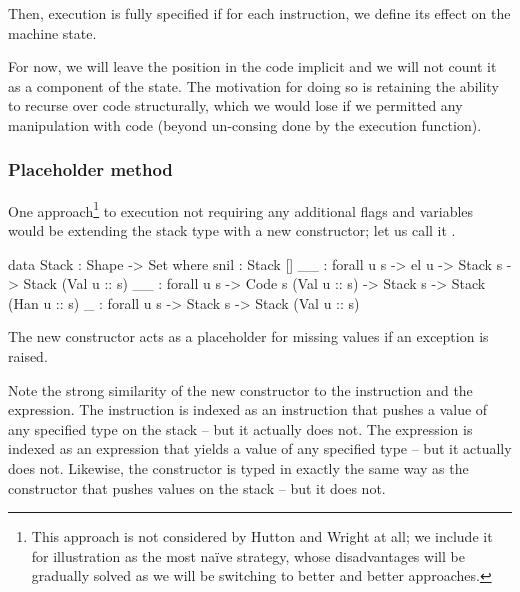 Then, execution is fully specified if for each instruction, we define its
effect on the machine state.

For now, we will leave the position in the code implicit and we will not count
it as a component of the state. The motivation for doing so is retaining
the ability to recurse over code structurally, which we would lose if we
permitted any manipulation with code (beyond un-consing done by the execution
function).

\subsubsection{Placeholder method}

One approach\footnote{This approach is not considered by Hutton and Wright at all;
we include it for illustration as the most na\"{i}ve strategy, whose disadvantages
will be gradually solved as we will be switching to better and better approaches.}
to execution not requiring any additional flags and variables
would be extending the stack type with a new constructor; let us call it
\ident{\void\scons\!\!\_}.
\begin{code}
  data Stack : Shape -> Set where
    snil : Stack []
    _\scons\_ : forall {u s} -> el u -> Stack s -> Stack (Val u :: s)
    _\sconsh\_ : forall {u s} -> Code s (Val u :: s) -> Stack s -> Stack (Han u :: s)
    \void\scons\_ : forall {u s} -> Stack s -> Stack (Val u :: s)
\end{code}
The new constructor acts as a placeholder for missing values if an exception is raised.

Note the strong similarity of the new constructor \ident{\void\scons\_} to the
 instruction and the 
expression. The instruction  is indexed as an instruction that pushes
a value of any specified type on the stack -- but it actually does not. The 
 expression is indexed as an expression that yields a value of any specified
type -- but it actually does not. Likewise, the \ident{\void} constructor is typed in
exactly the same way as the constructor that pushes values on the stack -- but it does not.

